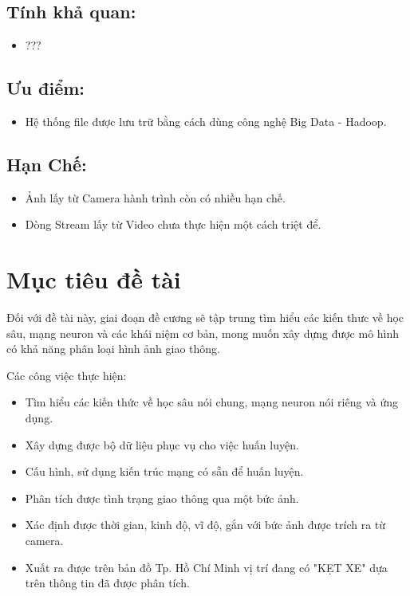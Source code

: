 \subsection{Tính khả quan:}
\begin{itemize}
\item ???
\end{itemize}
\subsection{Ưu điểm:}
\begin{itemize}
\item Hệ thống file được lưu trữ bằng cách dùng công nghệ Big Data - Hadoop.
\end{itemize}
\subsection{Hạn Chế:}
\begin{itemize}
\item Ảnh lấy từ Camera hành trình còn có nhiều hạn chế.
\item Dòng Stream lấy từ Video chưa thực hiện một cách triệt để.
\end{itemize}
\section{Mục tiêu đề tài}
Đối với đề tài này, giai đoạn đề cương sẽ tập trung tìm hiểu các kiến thưc về học sâu, mạng neuron và các khái niệm cơ bản, mong muốn xây dựng được mô hình có khả năng phân loại hình ảnh giao thông.\par
Các công việc thực hiện:
\begin{itemize}
	\item Tìm hiểu các kiến thức về học sâu nói chung, mạng neuron nói riêng và ứng dụng.
	\item Xây dựng được bộ dữ liệu phục vụ cho việc huấn luyện.
	\item Cấu hình, sử dụng kiến trúc mạng có sẵn để huấn luyện.
	\item Phân tích được tình trạng giao thông qua một bức ảnh.
	\item Xác định được thời gian, kinh độ, vĩ độ, gắn với bức ảnh được trích ra từ camera.
	\item Xuất ra được trên bản đồ Tp. Hồ Chí Minh vị trí đang có "KẸT XE" dựa trên thông tin đã được phân tích.	
\end{itemize}



